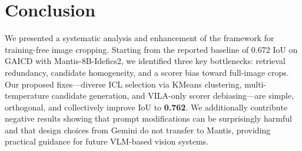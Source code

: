 \section{Conclusion}
\label{sec:conclusion}

We presented a systematic analysis and enhancement of the \baseline
framework for training-free image cropping.  Starting from the reported
baseline of 0.672 IoU on GAICD with Mantis-8B-Idefics2, we identified
three key bottlenecks: retrieval redundancy, candidate homogeneity, and
a scorer bias toward full-image crops.  Our proposed fixes---diverse ICL
selection via KMeans clustering, multi-temperature candidate generation,
and VILA-only scorer debiasing---are simple, orthogonal, and collectively
improve IoU to \textbf{0.762}.  We additionally contribute negative
results showing that prompt modifications can be surprisingly harmful
and that design choices from Gemini do not transfer to Mantis, providing
practical guidance for future VLM-based vision systems.
